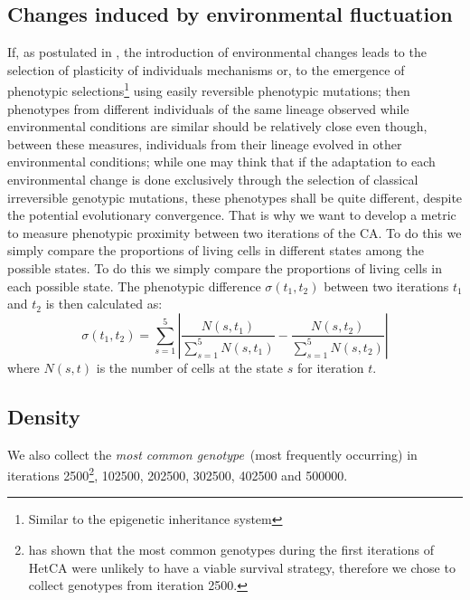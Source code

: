 \documentclass[letterpaper]{article}
\begin{document}
\subsection{Changes induced by environmental fluctuation}
If, as postulated in \citep{jablonka2014evolution}, the introduction of environmental changes leads to the selection of plasticity of individuals mechanisms or, to the emergence of phenotypic selections\footnote{Similar to the epigenetic inheritance system} using easily reversible phenotypic mutations; then phenotypes from different individuals of the same lineage observed while environmental conditions are similar should be relatively close even though, between these measures, individuals from their lineage evolved in other environmental conditions; while one may think that if the adaptation to each environmental change is done exclusively through the selection of classical irreversible genotypic mutations, these phenotypes shall be quite different, despite the potential evolutionary convergence. That is why we want to develop a metric to measure phenotypic proximity between two iterations of the CA. To do this we simply compare the proportions of living cells in different states among the possible states. To do this we simply compare the proportions of living cells in each possible state. The phenotypic difference $\sigma(t_1,t_2)$ between two iterations $t_1$ and $t_2$ is then calculated as:
$$\sigma(t_1,t_2) = \sum_{s=1}^5 | \frac{N(s,t_1)}{\sum_{s=1}^5 N(s,t_1)}-\frac{N(s,t_2)}{\sum_{s=1}^5 N(s,t_2)}|$$ where $N(s,t)$ is the number of cells at the state $s$ for iteration $t$.

\subsection{Density}
We also collect the \emph{most common genotype}~(most frequently occurring) in iterations 2500\footnote{\citep{medernach2015evolutionary}  has shown that the most common genotypes during the first iterations of HetCA were unlikely to have a viable survival strategy, therefore we chose to collect genotypes from iteration 2500.}, 102500, 202500, 302500, 402500 and 500000. 
\end{document}
